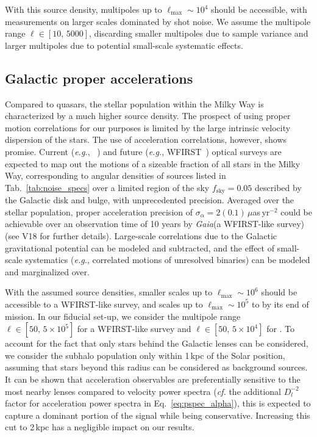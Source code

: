 \documentclass[prd,aps,twocolumn,nofootinbib,superscriptaddress,preprintnumbers,balancelastpage,longbibliography,floatfix]{revtex4-1}
\begin{document}
With this source density, multipoles up to $\ell_\mathrm{max}\sim10^4$ should be accessible, with measurements on larger scales dominated by shot noise. We assume the multipole range $\ell\in[10,\,5000]$, discarding smaller multipoles due to sample variance and larger multipoles due to potential small-scale systematic effects.

\subsection{Galactic proper accelerations}

Compared to quasars, the stellar population within the Milky Way is characterized by a much higher source density. The prospect of using proper motion correlations for our purposes is limited by the large intrinsic velocity dispersion of the stars. The use of acceleration correlations, however, shows promise. Current (\emph{e.g.}, \Gaia~\cite{Prusti:2016bjo}) and future (\emph{e.g.}, WFIRST~\cite{2017arXiv171205420S}) optical surveys are expected to map out the motions of a sizeable fraction of all stars in the Milky Way, corresponding to angular densities of sources listed in Tab.~\ref{tab:noise_specs} over a limited region of the sky $f_\mathrm{sky} = 0.05$ described by the Galactic disk and bulge, with unprecedented precision. Averaged over the stellar population, proper acceleration precision of $\sigma_\alpha=2(0.1)\,\mu$as\,yr$^{-2}$ could be achievable over an observation time of 10 years by \emph{Gaia}(a WFIRST-like survey)  (see V18 for further details). Large-scale correlations due to the Galactic gravitational potential can be modeled and subtracted, and the effect of small-scale systematics (\emph{e.g.}, correlated motions of unresolved binaries) can be modeled and marginalized over.

With the assumed source densities, smaller scales up to $\ell_\mathrm{max}\sim10^6$ should be accessible to a WFIRST-like survey, and scales up to $\ell_\mathrm{max}\sim10^5$ to \Gaia by its end of mission. In our fiducial set-up, we consider the multipole range $\ell\in[50,\,5\times10^5]$ for a WFIRST-like survey and $\ell\in[50,\,5\times10^4]$ for \Gaia. To account for the fact that only stars behind the Galactic lenses can be considered, we consider the subhalo population only within 1\,kpc of the Solar position, assuming that stars beyond this radius can be considered as background sources. 
It can be shown that acceleration observables are preferentially sensitive to the most nearby lenses compared to velocity power spectra (\emph{cf.} the additional $D_l^{-2}$ factor for acceleration power spectra in Eq.~\eqref{eq:pspec_alpha}), this is expected to capture a dominant portion of the signal while being conservative.
Increasing this cut to 2\,kpc has a negligible impact on our results.
\end{document}
